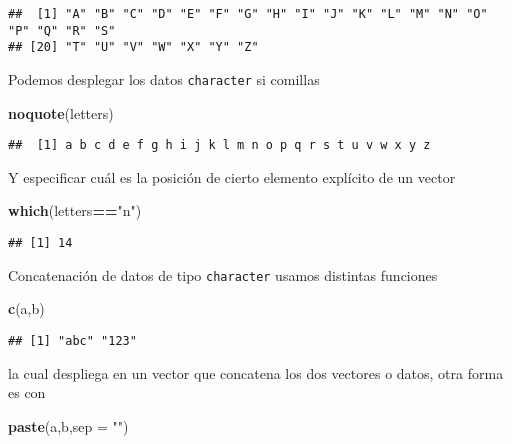 \documentclass[]{article}
\newenvironment{Shaded}{\begin{snugshade}}{\end{snugshade}}
\newcommand{\KeywordTok}[1]{\textcolor[rgb]{0.13,0.29,0.53}{\textbf{#1}}}
\newcommand{\DataTypeTok}[1]{\textcolor[rgb]{0.13,0.29,0.53}{#1}}
\newcommand{\StringTok}[1]{\textcolor[rgb]{0.31,0.60,0.02}{#1}}
\newcommand{\OperatorTok}[1]{\textcolor[rgb]{0.81,0.36,0.00}{\textbf{#1}}}
\newcommand{\NormalTok}[1]{#1}
\begin{document}
\begin{verbatim}
##  [1] "A" "B" "C" "D" "E" "F" "G" "H" "I" "J" "K" "L" "M" "N" "O" "P" "Q" "R" "S"
## [20] "T" "U" "V" "W" "X" "Y" "Z"
\end{verbatim}

Podemos desplegar los datos \texttt{character} si comillas

\begin{Shaded}
\begin{Highlighting}[]
\KeywordTok{noquote}\NormalTok{(letters)}
\end{Highlighting}
\end{Shaded}

\begin{verbatim}
##  [1] a b c d e f g h i j k l m n o p q r s t u v w x y z
\end{verbatim}

Y especificar cuál es la posición de cierto elemento explícito de un
vector

\begin{Shaded}
\begin{Highlighting}[]
\KeywordTok{which}\NormalTok{(letters}\OperatorTok{==}\StringTok{"n"}\NormalTok{)}
\end{Highlighting}
\end{Shaded}

\begin{verbatim}
## [1] 14
\end{verbatim}

Concatenación de datos de tipo \texttt{character} usamos distintas
funciones

\begin{Shaded}
\begin{Highlighting}[]
\KeywordTok{c}\NormalTok{(a,b)}
\end{Highlighting}
\end{Shaded}

\begin{verbatim}
## [1] "abc" "123"
\end{verbatim}

la cual despliega en un vector que concatena los dos vectores o datos,
otra forma es con

\begin{Shaded}
\begin{Highlighting}[]
\KeywordTok{paste}\NormalTok{(a,b,}\DataTypeTok{sep =} \StringTok{""}\NormalTok{)}
\end{Highlighting}
\end{Shaded}
\end{document}
